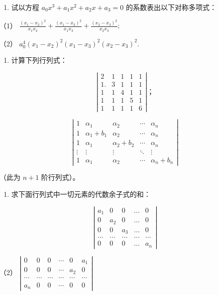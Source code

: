 \begin{enumerate}[start=26]
\item
  试以方程 \(a_0x^3 + a_1x^2 + a_2x + a_3 = 0\)
  的系数表出以下对称多项式：
\end{enumerate}

（1）
\(\frac{(x_1 - x_2)^2}{x_1x_2} + \frac{(x_1 - x_3)^2}{x_1x_3} + \frac{(x_2 - x_3)^2}{x_2x_3};\)

（2） \(a_0^4 (x_1 - x_2)^2 (x_1 - x_3)^2 (x_2 - x_3)^2.\)

\begin{enumerate}[start=27]
\item
  计算下列行列式：
\end{enumerate}

\[
\left| \begin{array}{ccccc} 2 & 1 & 1 & 1 & 1 \\ 1. & 3 & 1 & 1 & 1 \\ 1 & 1 & 4 & 1 & 1 \\ 1 & 1 & 1 & 5 & 1 \\ 1 & 1 & 1 & 1 & 6 \end{array} \right|\text{；} \tag {2}
\]

\[
\left|
\begin{array}{ccccc}
1&\alpha_1&\alpha_2&\cdots&\alpha_n\\
1&\alpha_1+b_1&\alpha_2&\cdots&\alpha_n\\
1&\alpha_1&\alpha_2+b_2&\cdots&\alpha_n\\
\vdots&\vdots&\vdots&\ddots&\vdots\\
1&\alpha_1&\alpha_2&\cdots&\alpha_n+b_n
\end{array}
\right|
\]

（此为 \(n+1\) 阶行列式）。

\begin{enumerate}[start=28]
\item
  求下面行列式中一切元素的代数余子式的和：
\end{enumerate}

\[
\left| \begin{array}{ccccc} a _ {1} & 0 & 0 & \dots & 0 \\ 0 & a _ {2} & 0 & \dots & 0 \\ 0 & 0 & a _ {3} & \dots & 0 \\ \dots & \dots & \dots & \dots & \dots \\ 0 & 0 & 0 & \dots & a _ {n} \end{array} \right| \tag {1}
\]

（2）
\(\left| \begin{array}{cccccc}0 & 0 & 0 & \cdots & 0 & a_1\\ 0 & 0 & 0 & \cdots & a_2 & 0\\ \cdots & \cdots & \cdots & \cdots & \cdots & \cdots \\ a_n & 0 & 0 & \cdots & 0 & 0 \end{array} \right|\)

